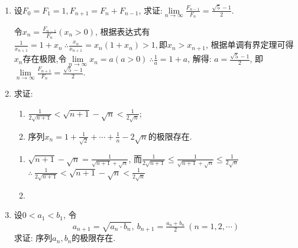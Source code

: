 \begin{enumerate}
\begin{solution}
		
	\end{solution}
	\item 设$F_0=F_1=1,F_{n+1}=F_n+F_{n-1}$, 求证:$\lim\limits_{n\rightarrow \infty}\tfrac{F_{n-1}}{F_n}=\frac{\sqrt{5}-1}{2}$.
	\begin{solution}
		令$x_n=\frac{F_{n-1}}{F_n}(x_n>0)$, 根据表达式有$\frac{1}{x_{n+1}}=1+x_n\ \therefore \frac{x_n}{x_{n+1}}=x_n(1+x_n)>1,\text{即}x_n>x_{n+1}$, 根据单调有界定理可得${x_n}$存在极限,令$\lim\limits_{n \rightarrow \infty}x_n=a(a>0)\ \therefore \frac{1}{a}=1+a$, 解得: $a=\frac{\sqrt{5}-1}{2}$, 即$\lim\limits_{n\rightarrow \infty}\frac{F_{n+1}}{F_n}=\frac{\sqrt{5}-1}{2}$.
	\end{solution}
	\item 求证:
	\begin{enumerate}
		\item $\frac{1}{2\sqrt{n+1}}<\sqrt{n+1}-\sqrt{n}<\frac{1}{2\sqrt{n}}$;
		\item 序列$x_n=1+\frac{1}{\sqrt{2}}+\cdots+\frac{1}{n}-2\sqrt{n}$的极限存在.
	\end{enumerate}
	\begin{solution}
		\begin{enumerate}
			
		 \item 	$\sqrt{n+1}-\sqrt{n}=\frac{1}{\sqrt{n+1}+\sqrt{n}}$, 而$ \frac{1}{2\sqrt{n+1}}\le \frac{1}{\sqrt{n+1}+\sqrt{n}}\le \frac{1}{2\sqrt{n}}$\ 
			$\therefore\ \frac{1}{2\sqrt{n+1}}<\sqrt{n+1}-\sqrt{n}<\frac{1}{2\sqrt{n}}$
		\item 
		\end{enumerate}
		
		
	\end{solution}
	\item 设$0<a_1<b_1$, 令
	$$
		a_{n+1} = \sqrt{a_n\cdot b_n},\ b_{n+1}=\tfrac{a_n+b_n}{2}\ (n=1,2,\cdots)
	$$求证: 序列${a_n},{b_n}的极限存在$.
	\begin{solution}
		

\end{solution}
\end{enumerate}
